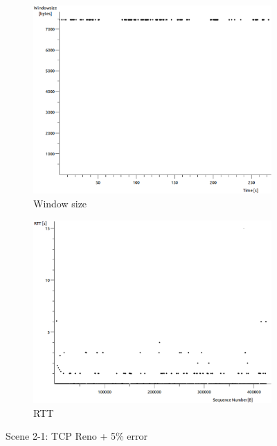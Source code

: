 \documentclass[conference,a4paper]{IEEEtran}
\begin{document}
\begin{figure}
\begin{subfigure}[b]{0.2\textwidth}
  \includegraphics[width=\textwidth]{s2-1_wnd}
  \caption{Window size}
 \end{subfigure}
 \begin{subfigure}[b]{0.2\textwidth}
  \includegraphics[width=\textwidth]{s2-1_rtt}
  \caption{RTT}
 \end{subfigure}
 \caption{Scene 2-1: TCP Reno + 5\% error}
\end{figure}
\end{document}
